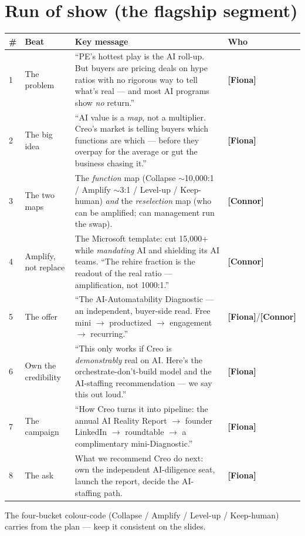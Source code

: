 \documentclass[11pt]{article}
\newcommand{\F}{\textcolor{creoaccent}{\textbf{[Fiona]}}}
\newcommand{\C}{\textcolor{creonavy}{\textbf{[Connor]}}}
\begin{document}
\section{Run of show (the flagship segment)}
\begin{center}
\renewcommand{\arraystretch}{1.3}\small
\begin{tabular}{p{0.6cm} p{3.2cm} p{7.7cm} p{1.1cm}}
\toprule
\# & \textbf{Beat} & \textbf{Key message} & \textbf{Who} \\
\midrule
1 & The problem & ``PE's hottest play is the AI roll-up. But buyers are pricing deals on hype ratios with no rigorous way to tell what's real --- and most AI programs show \emph{no} return.'' & \F \\
2 & The big idea & ``AI value is a \emph{map}, not a multiplier. Creo's market is telling buyers which functions are which --- before they overpay for the average or gut the business chasing it.'' & \F \\
3 & The two maps & The \emph{function} map (Collapse $\sim$10{,}000:1 / Amplify $\sim$3:1 / Level-up / Keep-human) \emph{and} the \emph{reselection} map (who can be amplified; can management run the swap). & \C \\
4 & Amplify, not replace & The Microsoft template: cut 15{,}000+ while \emph{mandating} AI and shielding its AI teams. ``The rehire fraction is the readout of the real ratio --- amplification, not 1000:1.'' & \C \\
5 & The offer & ``The AI-Automatability Diagnostic --- an independent, buyer-side read. Free mini $\to$ productized $\to$ engagement $\to$ recurring.'' & \F/\C \\
6 & Own the credibility & ``This only works if Creo is \emph{demonstrably} real on AI. Here's the orchestrate-don't-build model and the AI-staffing recommendation --- we say this out loud.'' & \F \\
7 & The campaign & ``How Creo turns it into pipeline: the annual AI Reality Report $\to$ founder LinkedIn $\to$ roundtable $\to$ a complimentary mini-Diagnostic.'' & \F \\
8 & The ask & What we recommend Creo do next: own the independent AI-diligence seat, launch the report, decide the AI-staffing path. & \F \\
\bottomrule
\end{tabular}
\end{center}
The four-bucket colour-code (Collapse / Amplify / Level-up / Keep-human) carries from the plan
--- keep it consistent on the slides.
\end{document}

